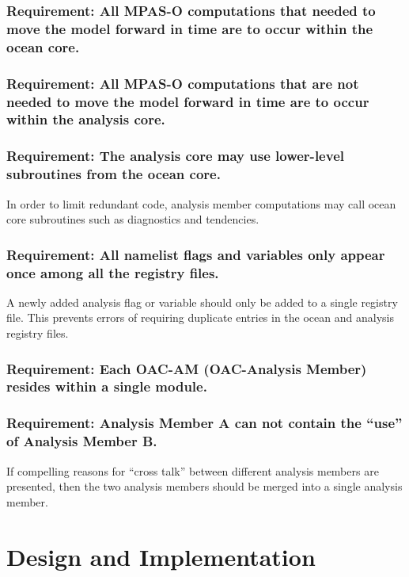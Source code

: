 \documentclass[11pt]{report}
\begin{document}
\subsection{Requirement: All MPAS-O computations that needed to move the model forward in time are to occur within the ocean core.}

\subsection{Requirement: All MPAS-O computations that are not needed to move the model forward in time are to occur within the analysis core.}

\subsection{{\color{red} Requirement}: The analysis core may use lower-level subroutines from the ocean core.}
In order to limit redundant code, analysis member computations may call ocean core subroutines such as diagnostics and tendencies.

\subsection{Requirement: All namelist flags and variables only appear once among all the registry files.}
A newly added analysis flag or variable should only be added to a single registry file.  This prevents errors of requiring duplicate entries in the ocean and analysis registry files.

\subsection{Requirement: Each OAC-AM (OAC-Analysis Member) resides within a single module.}

\subsection{Requirement: Analysis Member A can not contain the ``use'' of Analysis Member B.}
If compelling reasons for ``cross talk'' between different analysis members are presented, then the two analysis members should be merged into a single analysis member.



\chapter{Design and Implementation}
\end{document}
